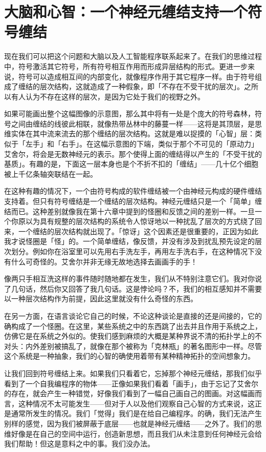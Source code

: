 \documentclass[
  12pt,
  twoside,
  openright,
  oldfontcommands,
]{memoir}
\begin{document}
\section{大脑和心智：一个神经元缠结支持一个符号缠结}

现在我们可以把这个问题和大脑以及人工智能程序联系起来了。在我们的思维过程中，符号激活其它符号，所有符号相互作用而形成异层结构的形式。更进一步来说，符号可以造成相互间的内部变化，就像程序作用于其它程序一样。由于符号组成了缠结的层次结构，这就造成了一种假象，即「不存在不受干扰的层次」。之所以有人认为不存在这样的层次，是因为它处于我们的视野之外。

如果可能画出整个这幅图像的示意图，那么其中将有一处是个庞大的符号森林，符号之间由缠结的线彼此相联，就像热带丛林中的藤蔓一样------这将是其顶层，是思维实体在其中流来流去的那个缠结的层次结构。这就是难以捉摸的「心智」层：类似于「左手」和「右手」。在这幅示意图的下端，类似于那个不可见的「原动力」艾舍尔，将会是无数神经元的表示。那个使得上面的缠结得以产生的「不受干扰的基质」。有趣的是，下面这一层本身也是个不折不扣的「缠结」------几十亿个细胞被上千亿条轴突联结在一起。

在这种有趣的情况下，一个由符号构成的软件缠结被一个由神经元构成的硬件缠结支持着。但只有符号缠结是一个缠结的层次结构。神经元缠结只是一个「简单」缠结而已。这种差别就像我在第十六章中提到的怪圈和反馈之间的差别一样。一旦一个你原以为具有规整的层次结构的系统令人惊讶地以一种扰乱了层次的方式绕了回来，一个缠结的层次结构就出现了。「惊讶」这个因素还是很重要的，正因为如此我才说怪圈是「怪」的。一个简单缠结，像反馈，并没有涉及到扰乱预先设定的层次划分。例如你在浴室里可以先用右手洗左手，再用左手洗右手，在这种情况下没有什么可奇怪的。艾舍尔并非无缘无故地选择去画画手的手！

像两只手相互洗这样的事件随时随地都在发生，我们从不特别注意它们。我对你说了几句话，然后你又回答了我几句话。这是悖论吗？不，我们的相互感知并不需要以一种层次结构作为前提，因此这里就没有什么奇怪的东西。

在另一方面，在语言谈论它自己的时候，不论这种谈论是直接的还是间接的，它的确构成了一个怪圈。在这里，某些系统之中的东西跳了出去并且作用于系统之上，仿佛它是在系统之外似的。使我们感到麻烦的大概是某种界说不清的拓扑学上的不对头：内外差别被搞乱了，就像在那个被称为「克林瓶」的著名图形中一样。尽管这个系统是一种抽象，我们的心智的确使用着带有某种精神拓扑的空间想象力。

让我们回到符号缠结上来。如果我们只看着它，忘掉那个神经元缠结，那我们似乎看到了一个自我编程序的物体------正像如果我们看着「画手」，由于忘记了艾舍尔的存在，就会产生一种错觉，好像我们看到了一幅自己画自己的图画。对这幅画而言，这种情况不太可能发生------但对于人以及他们观察自己心智的方式来说，这正是通常所发生的情况。我们「觉得」我们是在给自己编程序。的确，我们无法产生别样的感觉，因为我们被屏蔽于底层------也就是神经元缠结------之外了。我们的思维好像是在自己的空间中运行，创造新思想，而且我们从未注意到任何神经元会给我们帮助！但这是意料之中的事。我们没办法。
\end{document}
